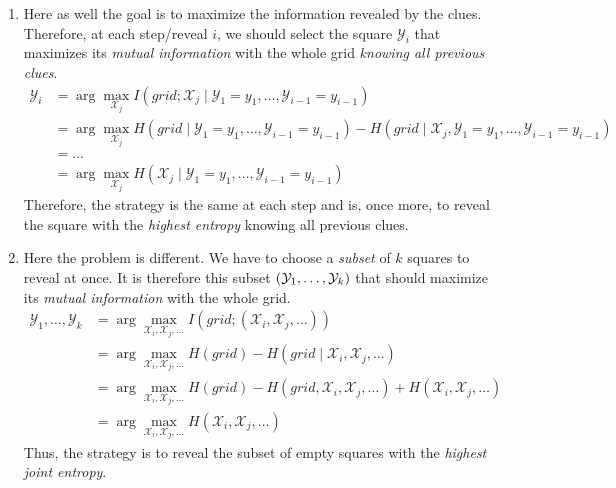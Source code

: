\documentclass[a4paper, 12pt]{article}
\newcommand{\X}{\mathcal{X}}
\newcommand{\Y}{\mathcal{Y}}
\begin{document}
\begin{enumerate}[leftmargin=*]
        \item Here as well the goal is to maximize the information revealed by the clues. Therefore, at each step/reveal $i$, we should select the square $\Y_i$ that maximizes its \emph{mutual information} with the whole grid \emph{knowing all previous clues}.
        \begin{align}
            \Y_i & = \arg\max_{\X_j} I(grid; \X_j \mid \Y_1 = y_1, \ldots, \Y_{i - 1} = y_{i - 1}) \nonumber \\
            & = \arg\max_{\X_j} H(grid \mid \Y_1 = y_1, \ldots, \Y_{i - 1} = y_{i - 1}) - H(grid \mid \X_j, \Y_1 = y_1, \ldots, \Y_{i - 1} = y_{i - 1}) \nonumber \\
            & = \ldots \nonumber \\
            & = \arg\max_{\X_j} H(\X_j \mid \Y_1 = y_1, \ldots, \Y_{i - 1} = y_{i - 1})
        \end{align}
        Therefore, the strategy is the same at each step and is, once more, to reveal the square with the \emph{highest entropy} knowing all previous clues.
        
        \item Here the problem is different. We have to choose a \emph{subset} of $k$ squares to reveal at once. It is therefore this subset $\rbk{\Y_1, \ldots, \Y_k}$ that should maximize its \emph{mutual information} with the whole grid.
        \begin{align}
            \Y_1, \ldots, \Y_k & = \arg\max_{\X_i, \X_j, \ldots} I(grid; (\X_i, \X_j, \ldots)) \nonumber \\
            & = \arg\max_{\X_i, \X_j, \ldots} H(grid) - H(grid \mid \X_i, \X_j, \ldots) \nonumber \\
            & = \arg\max_{\X_i, \X_j, \ldots} H(grid) - H(grid, \X_i, \X_j, \ldots) + H(\X_i, \X_j, \ldots) \nonumber \\
            & = \arg\max_{\X_i, \X_j, \ldots} H(\X_i, \X_j, \ldots)
        \end{align}
        Thus, the strategy is to reveal the subset of empty squares with the \emph{highest joint entropy}.
    \end{enumerate}
    
    
\end{document}
